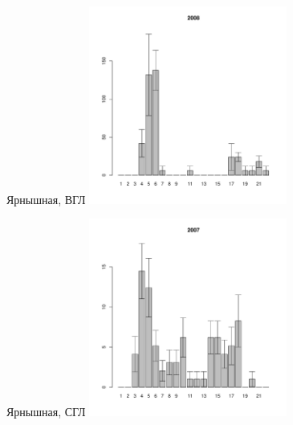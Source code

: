 	\begin{figure}[h]
	
	\begin{minipage}[b]{.46\linewidth}
	\begin{center}
	{\tiny Ярнышная, ВГЛ}
	\includegraphics[width=65mm]{../Barenc_Sea/Yarnyshnaya/high_2008_.pdf}
	\end{center}
	\end{minipage}
	\hfil %
	\begin{minipage}[b]{.46\linewidth}
	\begin{center}
	{\tiny Ярнышная, СГЛ}
	\includegraphics[width=65mm]{../Barenc_Sea/Yarnyshnaya/middle_2007_.pdf}
	\end{center}
	\end{minipage}
	\begin{minipage}[b]{.46\linewidth}


\end{minipage}
\end{figure}
